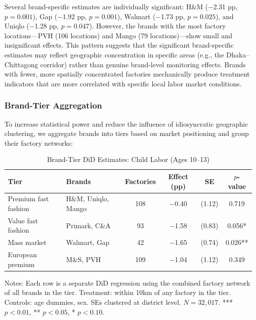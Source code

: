 \documentclass[12pt]{article}
\begin{document}
Several brand-specific estimates are individually significant: H\&M ($-$2.31 pp, $p = 0.001$), Gap ($-$1.92 pp, $p = 0.001$), Walmart ($-$1.73 pp, $p = 0.025$), and Uniqlo ($-$1.28 pp, $p = 0.047$). However, the brands with the most factory locations---PVH (106 locations) and Mango (79 locations)---show small and insignificant effects. This pattern suggests that the significant brand-specific estimates may reflect geographic concentration in specific areas (e.g., the Dhaka--Chittagong corridor) rather than genuine brand-level monitoring effects. Brands with fewer, more spatially concentrated factories mechanically produce treatment indicators that are more correlated with specific local labor market conditions.

\subsubsection{Brand-Tier Aggregation}

To increase statistical power and reduce the influence of idiosyncratic geographic clustering, we aggregate brands into tiers based on market positioning and group their factory networks:

\begin{table}[H]
\centering
\caption{Brand-Tier DiD Estimates: Child Labor (Ages 10--13)}
\label{tab:brand_tier}
\begin{threeparttable}
\begin{tabular}{llcccc}
\toprule
Tier & Brands & Factories & Effect (pp) & SE & $p$-value \\
\midrule
Premium fast fashion & H\&M, Uniqlo, Mango & 108 & $-$0.40 & (1.12) & 0.719 \\
Value fast fashion & Primark, C\&A & 93 & $-$1.58 & (0.83) & 0.056* \\
Mass market & Walmart, Gap & 42 & $-$1.65 & (0.74) & 0.026** \\
European premium & M\&S, PVH & 109 & $-$1.04 & (1.12) & 0.349 \\
\bottomrule
\end{tabular}
\begin{tablenotes}
\footnotesize
\item Notes: Each row is a separate DiD regression using the combined factory network of all brands in the tier. Treatment: within 10km of any factory in the tier. Controls: age dummies, sex. SEs clustered at district level. $N = 32{,}017$. *** $p<0.01$, ** $p<0.05$, * $p<0.10$.
\end{tablenotes}
\end{threeparttable}
\end{table}
\end{document}
